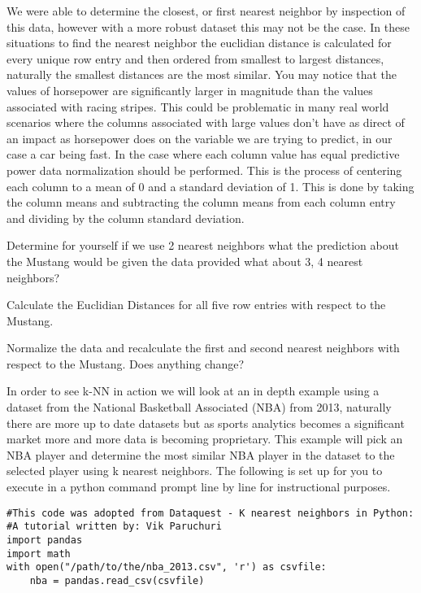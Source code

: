 We were able to determine the closest, or first nearest neighbor by
inspection of this data, however with a more robust dataset this may
not be the case. In these situations to find the nearest neighbor the
euclidian distance is calculated for every unique row entry and then
ordered from smallest to largest distances, naturally the smallest
distances are the most similar. You may notice that the values of
horsepower are significantly larger in magnitude than the values
associated with racing stripes. This could be problematic in many real
world scenarios where the columns associated with large values don't
have as direct of an impact as horsepower does on the variable we are
trying to predict, in our case a car being fast. In the case where
each column value has equal predictive power data normalization should
be performed. This is the process of centering each column to a mean
of 0 and a standard deviation of 1. This is done by taking the column
means and subtracting the column means from each column entry and
dividing by the column standard deviation. 

\begin{exercise} Determine for yourself if we use 2 nearest neighbors what the
prediction about the Mustang would be given the data provided what
about 3, 4  nearest neighbors? 
\end{exercise}

\begin{exercise} Calculate the Euclidian Distances for all five row
  entries with respect to the Mustang.
\end{exercise}

\begin{exercise} Normalize the data and recalculate the first and
  second nearest neighbors with respect to the Mustang. Does anything
  change? 
\end{exercise}

 

In order to see k-NN in action we will look at an in depth example using
a dataset from the National Basketball Associated (NBA) from 2013,
naturally there are more up to date datasets but as sports analytics
becomes a significant market more and more data is becoming
proprietary. This example will pick an NBA player and determine the
most similar NBA player in the dataset to the selected player using
k nearest neighbors. The following is set up for you to execute in a
python command prompt line by line for instructional purposes.  

\begin{lstlisting}
#This code was adopted from Dataquest - K nearest neighbors in Python:
#A tutorial written by: Vik Paruchuri
import pandas
import math
with open("/path/to/the/nba_2013.csv", 'r') as csvfile:
    nba = pandas.read_csv(csvfile)
\end{lstlisting}

